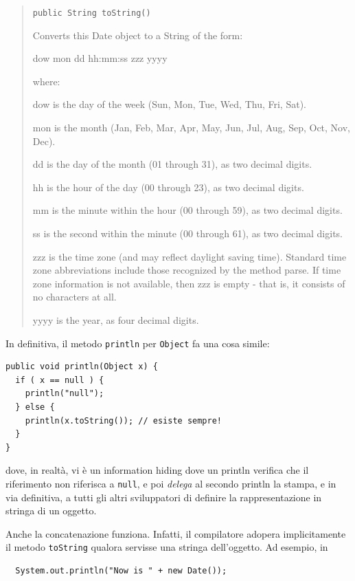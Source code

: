 \documentclass[\fontsizeclass,twocolumn]{\classname}
\theoremstyle{definition}
\theoremstyle{definition}
\begin{document}
\begin{quote}
    \footnotesize{\texttt{public String toString()}

  Converts this Date object to a String of the form:
  
  dow mon dd hh:mm:ss zzz yyyy
  
  where:
  
  dow is the day of the week (Sun, Mon, Tue, Wed, Thu, Fri, Sat).

  mon is the month (Jan, Feb, Mar, Apr, May, Jun, Jul, Aug, Sep, Oct, Nov, Dec).

  dd is the day of the month (01 through 31), as two decimal digits.

  hh is the hour of the day (00 through 23), as two decimal digits.

  mm is the minute within the hour (00 through 59), as two decimal digits.

  ss is the second within the minute (00 through 61), as two decimal digits.

  zzz is the time zone (and may reflect daylight saving time). Standard time
  zone abbreviations include those recognized by the method parse. If time zone
  information is not available, then zzz is empty - that is, it consists of no
  characters at all.

yyyy is the year, as four decimal digits.}
\end{quote}

In definitiva, il metodo \texttt{println} per \texttt{Object} fa una cosa simile:

\begin{lstlisting}
public void println(Object x) {
  if ( x == null ) {
    println("null");
  } else {
    println(x.toString()); // esiste sempre!
  }
}
\end{lstlisting}

dove, in realtà, vi è un information hiding dove un println verifica che il
riferimento non riferisca a \texttt{null}, e poi \emph{delega} al secondo println
la stampa, e in via definitiva, a tutti gli altri sviluppatori di definire la
rappresentazione in stringa di un oggetto.

Anche la concatenazione funziona. Infatti, il compilatore adopera implicitamente
il metodo \texttt{toString} qualora servisse una stringa dell'oggetto. Ad esempio, in 

\begin{lstlisting}
  System.out.println("Now is " + new Date());
\end{lstlisting}
\end{document}
